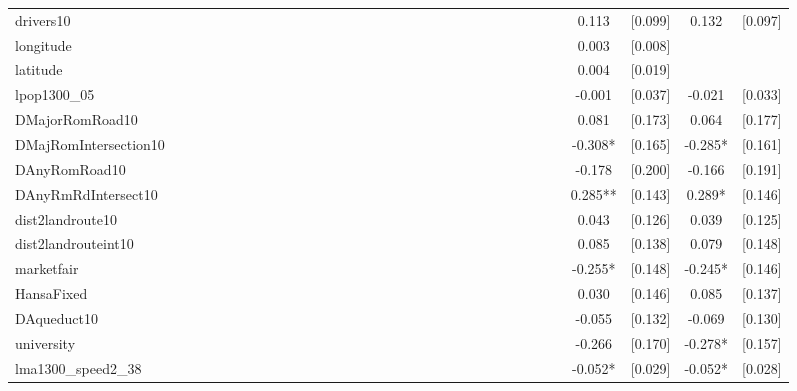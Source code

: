 \documentclass[landscape]{article}
\begin{document}
\begin{tabular}{lcccccccccccccccccccccccccccccccc}
drivers10 &  &  &  &  &  &  &  &  &  &  &  &  &  &  &  &  &  &  &  &  &  &  &  &  &  &  &  &  & 0.113 & [0.099] & 0.132 & [0.097] \\
longitude &  &  &  &  &  &  &  &  &  &  &  &  &  &  &  &  &  &  &  &  &  &  &  &  &  &  &  &  & 0.003 & [0.008] &  &  \\
latitude &  &  &  &  &  &  &  &  &  &  &  &  &  &  &  &  &  &  &  &  &  &  &  &  &  &  &  &  & 0.004 & [0.019] &  &  \\
lpop1300\_05 &  &  &  &  &  &  &  &  &  &  &  &  &  &  &  &  &  &  &  &  &  &  &  &  &  &  &  &  & -0.001 & [0.037] & -0.021 & [0.033] \\
DMajorRomRoad10 &  &  &  &  &  &  &  &  &  &  &  &  &  &  &  &  &  &  &  &  &  &  &  &  &  &  &  &  & 0.081 & [0.173] & 0.064 & [0.177] \\
DMajRomIntersection10 &  &  &  &  &  &  &  &  &  &  &  &  &  &  &  &  &  &  &  &  &  &  &  &  &  &  &  &  & -0.308* & [0.165] & -0.285* & [0.161] \\
DAnyRomRoad10 &  &  &  &  &  &  &  &  &  &  &  &  &  &  &  &  &  &  &  &  &  &  &  &  &  &  &  &  & -0.178 & [0.200] & -0.166 & [0.191] \\
DAnyRmRdIntersect10 &  &  &  &  &  &  &  &  &  &  &  &  &  &  &  &  &  &  &  &  &  &  &  &  &  &  &  &  & 0.285** & [0.143] & 0.289* & [0.146] \\
dist2landroute10 &  &  &  &  &  &  &  &  &  &  &  &  &  &  &  &  &  &  &  &  &  &  &  &  &  &  &  &  & 0.043 & [0.126] & 0.039 & [0.125] \\
dist2landrouteint10 &  &  &  &  &  &  &  &  &  &  &  &  &  &  &  &  &  &  &  &  &  &  &  &  &  &  &  &  & 0.085 & [0.138] & 0.079 & [0.148] \\
marketfair &  &  &  &  &  &  &  &  &  &  &  &  &  &  &  &  &  &  &  &  &  &  &  &  &  &  &  &  & -0.255* & [0.148] & -0.245* & [0.146] \\
HansaFixed &  &  &  &  &  &  &  &  &  &  &  &  &  &  &  &  &  &  &  &  &  &  &  &  &  &  &  &  & 0.030 & [0.146] & 0.085 & [0.137] \\
DAqueduct10 &  &  &  &  &  &  &  &  &  &  &  &  &  &  &  &  &  &  &  &  &  &  &  &  &  &  &  &  & -0.055 & [0.132] & -0.069 & [0.130] \\
university &  &  &  &  &  &  &  &  &  &  &  &  &  &  &  &  &  &  &  &  &  &  &  &  &  &  &  &  & -0.266 & [0.170] & -0.278* & [0.157] \\
lma1300\_speed2\_38 &  &  &  &  &  &  &  &  &  &  &  &  &  &  &  &  &  &  &  &  &  &  &  &  &  &  &  &  & -0.052* & [0.029] & -0.052* & [0.028] \\

\end{tabular}
\end{document}
